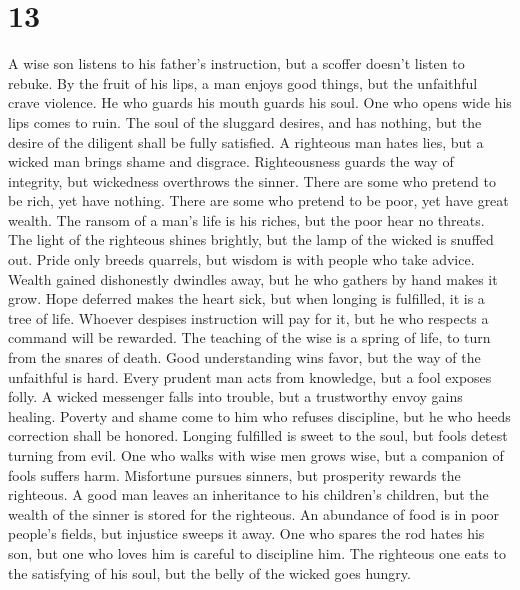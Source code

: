 \hypertarget{section-12}{%
\section{13}\label{section-12}}

 A wise son listens to his father's instruction, but a
scoffer doesn't listen to rebuke.  By the fruit of his lips,
a man enjoys good things, but the unfaithful crave violence.
 He who guards his mouth guards his soul. One who opens wide
his lips comes to ruin.  The soul of the sluggard desires,
and has nothing, but the desire of the diligent shall be fully
satisfied.  A righteous man hates lies, but a wicked man
brings shame and disgrace.  Righteousness guards the way of
integrity, but wickedness overthrows the sinner.  There are
some who pretend to be rich, yet have nothing. There are some who
pretend to be poor, yet have great wealth.  The ransom of a
man's life is his riches, but the poor hear no threats.  The
light of the righteous shines brightly, but the lamp of the wicked is
snuffed out.  Pride only breeds quarrels, but wisdom is
with people who take advice.  Wealth gained dishonestly
dwindles away, but he who gathers by hand makes it grow. 
Hope deferred makes the heart sick, but when longing is fulfilled, it is
a tree of life.  Whoever despises instruction will pay for
it, but he who respects a command will be rewarded.  The
teaching of the wise is a spring of life, to turn from the snares of
death.  Good understanding wins favor, but the way of the
unfaithful is hard.  Every prudent man acts from knowledge,
but a fool exposes folly.  A wicked messenger falls into
trouble, but a trustworthy envoy gains healing.  Poverty
and shame come to him who refuses discipline, but he who heeds
correction shall be honored.  Longing fulfilled is sweet to
the soul, but fools detest turning from evil.  One who
walks with wise men grows wise, but a companion of fools suffers harm.
 Misfortune pursues sinners, but prosperity rewards the
righteous.  A good man leaves an inheritance to his
children's children, but the wealth of the sinner is stored for the
righteous.  An abundance of food is in poor people's
fields, but injustice sweeps it away.  One who spares the
rod hates his son, but one who loves him is careful to discipline him.
 The righteous one eats to the satisfying of his soul, but
the belly of the wicked goes hungry.

